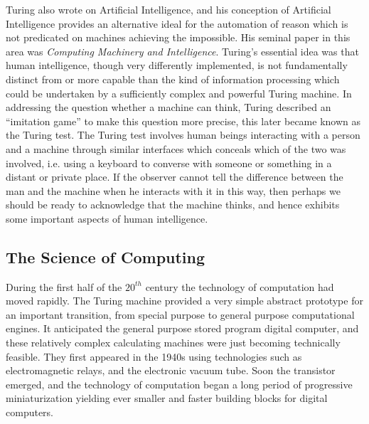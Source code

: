 Turing also wrote on Artificial Intelligence, and his conception of
Artificial Intelligence provides an alternative ideal for the
automation of reason which is not predicated on machines achieving the
impossible.
His seminal paper in this area was \emph{Computing Machinery and Intelligence}\cite{turingCMI}.
Turing's essential idea was that human intelligence, though very
differently implemented, is not fundamentally distinct from or more
capable than the kind of information processing which could be
undertaken by a sufficiently complex and powerful Turing machine.
In addressing the question whether a machine can think, Turing
described an ``imitation game'' to make this question more precise,
this later became known as the Turing test.
The Turing test involves human beings interacting with a person and a
machine through similar interfaces which conceals which of the two was
involved, i.e. using a keyboard to converse with someone or something
in a distant or private place.
If the observer cannot tell the difference between the man and the
machine when he interacts with it in this way, then perhaps we should
be ready to acknowledge that the machine thinks, and hence exhibits
some important aspects of human intelligence.

\subsection{The Science of Computing}

During the first half of the $20^{th}$ century the technology of
computation had  moved rapidly.
The Turing machine provided a very simple abstract prototype for an
important transition, from special purpose to general purpose
computational engines.
It anticipated the general purpose stored program digital computer,
and these relatively complex calculating machines were just becoming
technically feasible.
They first appeared in the 1940s using technologies such as
electromagnetic relays, and the electronic vacuum tube.
Soon the transistor emerged, and the technology of computation began a
long period of progressive miniaturization yielding ever smaller and
faster building blocks for digital computers.

